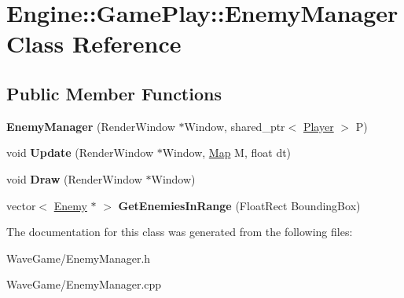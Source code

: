 \hypertarget{class_engine_1_1_game_play_1_1_enemy_manager}{}\section{Engine\+:\+:Game\+Play\+:\+:Enemy\+Manager Class Reference}
\label{class_engine_1_1_game_play_1_1_enemy_manager}
\subsection*{Public Member Functions}
\begin{DoxyCompactItemize}
\item 
\mbox{\label{class_engine_1_1_game_play_1_1_enemy_manager_ade8713180e51d8aa930677d23cf4c2a8}} 
{\bfseries Enemy\+Manager} (Render\+Window $\ast$Window, shared\+\_\+ptr$<$ \hyperlink{class_engine_1_1_game_play_1_1_player}{Player} $>$ P)
\item 
\mbox{\label{class_engine_1_1_game_play_1_1_enemy_manager_a545df3d86d86905d5db1e4bb8f327137}} 
void {\bfseries Update} (Render\+Window $\ast$Window, \hyperlink{class_engine_1_1_core_1_1_map}{Map} M, float dt)
\item 
\mbox{\label{class_engine_1_1_game_play_1_1_enemy_manager_a8feb401224cac44bec8b2d2c00b0910c}} 
void {\bfseries Draw} (Render\+Window $\ast$Window)
\item 
\mbox{\label{class_engine_1_1_game_play_1_1_enemy_manager_afc7a1062c7cf55177a8dd99f8547ec47}} 
vector$<$ \hyperlink{class_engine_1_1_game_play_1_1_enemy}{Enemy} $\ast$ $>$ {\bfseries Get\+Enemies\+In\+Range} (Float\+Rect Bounding\+Box)
\end{DoxyCompactItemize}


The documentation for this class was generated from the following files\+:\begin{DoxyCompactItemize}
\item 
Wave\+Game/Enemy\+Manager.\+h\item 
Wave\+Game/Enemy\+Manager.\+cpp\end{DoxyCompactItemize}
